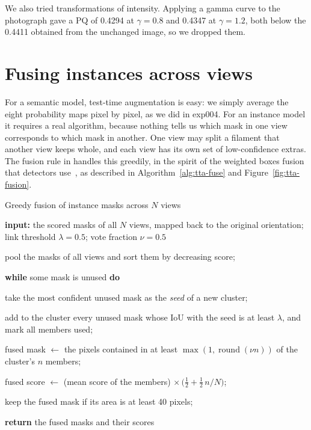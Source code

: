 We also tried transformations of intensity. Applying a gamma curve to the photograph gave a PQ of
0.4294 at $\gamma=0.8$ and 0.4347 at $\gamma=1.2$, both below the 0.4411 obtained from the unchanged
image, so we dropped them.

\section{Fusing instances across views}\label{sec:tta-fusion}
For a semantic model, test-time augmentation is easy: we simply average the eight probability maps
pixel by pixel, as we did in exp004. For an instance model it requires a real algorithm, because
nothing tells us which mask in one view corresponds to which mask in another. One view may split a
filament that another view keeps whole, and each view has its own set of low-confidence extras. The
fusion rule in  handles this greedily, in
the spirit of the weighted boxes fusion that detectors use~\citep{solovyev2021}, as described in
Algorithm~\ref{alg:tta-fuse} and Figure~\ref{fig:tta-fusion}.

\begin{algorithmblock}{Greedy fusion of instance masks across $N$ views\label{alg:tta-fuse}}
\item \textbf{input:} the scored masks of all $N$ views, mapped back to the original orientation; link threshold $\lambda=0.5$; vote fraction $\nu=0.5$
\item pool the masks of all views and sort them by decreasing score;
\item \textbf{while} some mask is unused \textbf{do}
\item \Ind take the most confident unused mask as the \emph{seed} of a new cluster;
\item \Ind add to the cluster every unused mask whose IoU with the seed is at least $\lambda$, and mark all members used;
\item \Ind fused mask $\leftarrow$ the pixels contained in at least $\max(1,\operatorname{round}(\nu n))$ of the cluster's $n$ members;
\item \Ind fused score $\leftarrow$ (mean score of the members) $\times\,\bigl(\tfrac12+\tfrac12\,n/N\bigr)$;
\item \Ind keep the fused mask if its area is at least 40 pixels;
\item \textbf{return} the fused masks and their scores
\end{algorithmblock}

